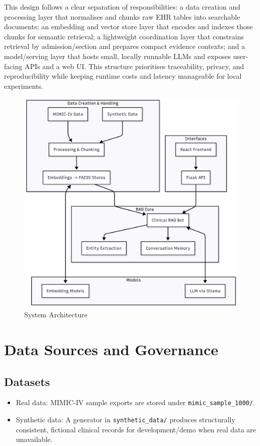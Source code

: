 This design follows a clear separation of responsibilities: a data creation and processing layer that normalises and chunks raw EHR tables into searchable documents; an embedding and vector store layer that encodes and indexes those chunks for semantic retrieval; a lightweight coordination layer that constrains retrieval by admission/section and prepares compact evidence contexts; and a model/serving layer that hosts small, locally runnable LLMs and exposes user-facing APIs and a web UI. This structure prioritises traceability, privacy, and reproducibility while keeping runtime costs and latency manageable for local experiments.
\begin{figure}[H]
  \centering
  \includegraphics[width=0.95\linewidth]{chap3_methodology/images/system_archi.png}
  \caption{System Architecture}
  \label{fig:system_architecture}
\end{figure}


\section{Data Sources and Governance}

\subsection{Datasets}
\begin{itemize}
  \item Real data: MIMIC-IV sample exports are stored under \texttt{mimic\_sample\_1000/}.
  \item Synthetic data: A generator in \texttt{synthetic\_data/} produces structurally consistent, fictional clinical records for development/demo when real data are unavailable.
\end{itemize}


